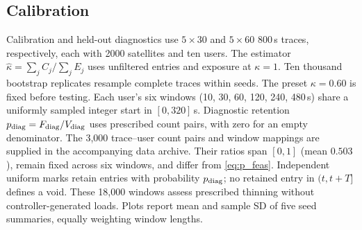 \documentclass[10pt,letterpaper,journal]{IEEEtran}
\begin{document}
\subsection{Calibration}
Calibration and held-out diagnostics use $5\times30$ and $5\times60$ 800\,s traces, respectively, each with 2000 satellites and ten users. The estimator $\widehat\kappa=\sum_j C_j/\sum_j E_j$ uses unfiltered entries and exposure at $\kappa=1$. Ten thousand bootstrap replicates resample complete traces within seeds. The preset $\kappa=0.60$ is fixed before testing. Each user's six windows (10, 30, 60, 120, 240, 480\,s) share a uniformly sampled integer start in $[0,320]$\,s. Diagnostic retention $p_{\rm diag}=F_{\rm diag}/V_{\rm diag}$ uses prescribed count pairs, with zero for an empty denominator. The 3,000 trace--user count pairs and window mappings are supplied in the accompanying data archive. Their ratios span $[0,1]$ (mean $0.503$), remain fixed across six windows, and differ from \eqref{eq:p_feas}. Independent uniform marks retain entries with probability $p_{\rm diag}$; no retained entry in $(t,t+T]$ defines a void. These 18,000 windows assess prescribed thinning without controller-generated loads. Plots report mean and sample SD of five seed summaries, equally weighting window lengths.

\endgroup







 \vfill
\end{document}
